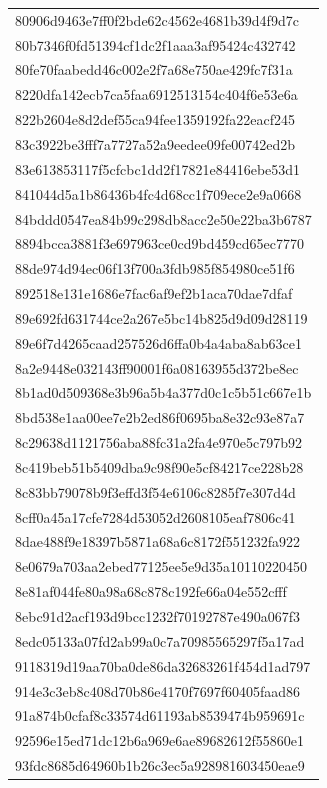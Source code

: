 \begin{tabular}{l}
80906d9463e7ff0f2bde62c4562e4681b39d4f9d7c \\
80b7346f0fd51394cf1dc2f1aaa3af95424c432742 \\
80fe70faabedd46c002e2f7a68e750ae429fc7f31a \\
8220dfa142ecb7ca5faa6912513154c404f6e53e6a \\
822b2604e8d2def55ca94fee1359192fa22eacf245 \\
83c3922be3fff7a7727a52a9eedee09fe00742ed2b \\
83e613853117f5cfcbc1dd2f17821e84416ebe53d1 \\
841044d5a1b86436b4fc4d68cc1f709ece2e9a0668 \\
84bddd0547ea84b99c298db8acc2e50e22ba3b6787 \\
8894bcca3881f3e697963ce0cd9bd459cd65ec7770 \\
88de974d94ec06f13f700a3fdb985f854980ce51f6 \\
892518e131e1686e7fac6af9ef2b1aca70dae7dfaf \\
89e692fd631744ce2a267e5bc14b825d9d09d28119 \\
89e6f7d4265caad257526d6ffa0b4a4aba8ab63ce1 \\
8a2e9448e032143ff90001f6a08163955d372be8ec \\
8b1ad0d509368e3b96a5b4a377d0c1c5b51c667e1b \\
8bd538e1aa00ee7e2b2ed86f0695ba8e32c93e87a7 \\
8c29638d1121756aba88fc31a2fa4e970e5c797b92 \\
8c419beb51b5409dba9c98f90e5cf84217ce228b28 \\
8c83bb79078b9f3effd3f54e6106c8285f7e307d4d \\
8cff0a45a17cfe7284d53052d2608105eaf7806c41 \\
8dae488f9e18397b5871a68a6c8172f551232fa922 \\
8e0679a703aa2ebed77125ee5e9d35a10110220450 \\
8e81af044fe80a98a68c878c192fe66a04e552cfff \\
8ebc91d2acf193d9bcc1232f70192787e490a067f3 \\
8edc05133a07fd2ab99a0c7a70985565297f5a17ad \\
9118319d19aa70ba0de86da32683261f454d1ad797 \\
914e3c3eb8c408d70b86e4170f7697f60405faad86 \\
91a874b0cfaf8c33574d61193ab8539474b959691c \\
92596e15ed71dc12b6a969e6ae89682612f55860e1 \\
93fdc8685d64960b1b26c3ec5a928981603450eae9 \\

\end{tabular}
